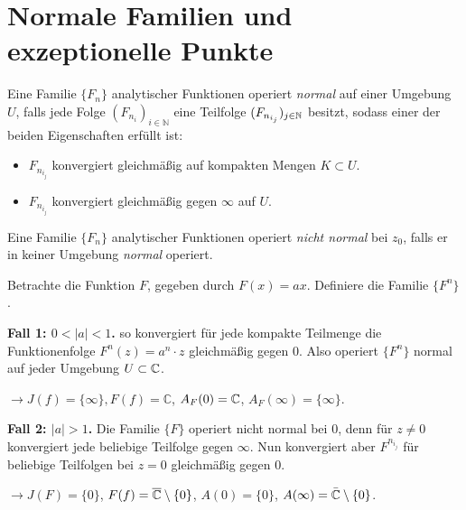 \documentclass{mywork}
\begin{document}
\section{Normale Familien und exzeptionelle Punkte}

\begin{df} \label{4}
Eine Familie $\{F_n\}$ analytischer Funktionen operiert \emph{normal} auf einer Umgebung $U$, falls jede Folge $(F_{n_i})_{i\in \mathbb{N}}$ eine Teilfolge $(F_{n_{i_j}})_{j\in \mathbb{N}}$ besitzt, sodass einer der beiden Eigenschaften erfüllt ist:
\begin{itemize}
\item $F_{n_{i_j}}$ konvergiert gleichmäßig auf kompakten Mengen $K\subset U$.
\item $F_{n_{i_j}}$ konvergiert gleichmäßig gegen $\infty$ auf $U$.
\end{itemize}
Eine Familie $\{F_n\}$ analytischer Funktionen operiert \emph{nicht normal} bei $z_0$, falls er in keiner Umgebung \emph{normal} operiert.
\end{df}



\begin{ex}\label{5}
Betrachte die Funktion $F$, gegeben durch $F(x)=ax$. Definiere die Familie $\{F^n\}$.

\textbf{Fall 1: $0<|a|<1$.} so konvergiert für jede kompakte Teilmenge die Funktionenfolge $F^n(z)=a^n\cdot z$ gleichmäßig gegen 0. Also operiert $\{F^n\}$ normal auf jeder Umgebung $U\subset \mathbb{C}$. 

$\longrightarrow J(f)=\{\infty\}, F(f)=\mathbb{C}$, $A_F(0)=\mathbb{C}$, $A_F(\infty)=\{\infty\}$.

\textbf{Fall 2: $|a|>1$.} Die Familie $\{F\}$ operiert nicht normal bei $0$, denn für $z\neq 0$ konvergiert jede beliebige Teilfolge gegen $\infty$. Nun konvergiert aber $F^{n_{i_j}}$ für beliebige Teilfolgen bei $z=0$ gleichmäßig gegen $0$.

$\longrightarrow J(F)=\{0\}$, $F(f)=\overline{\mathbb{C}}\setminus \{0\}$, $A(0)=\{0\}$, $A(\infty)=\bar{\mathbb{C}}\setminus \{0\}$. 
\end{ex}
\end{document}

